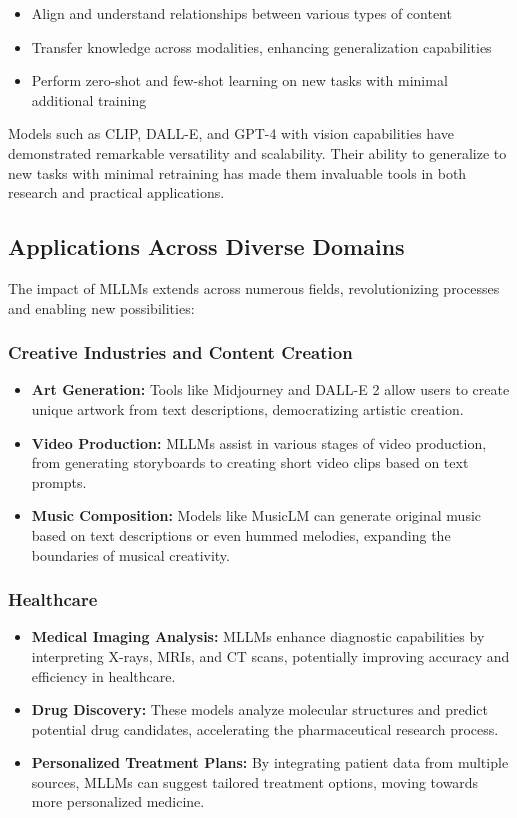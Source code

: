 \begin{itemize}
    \item Align and understand relationships between various types of content
    \item Transfer knowledge across modalities, enhancing generalization capabilities
    \item Perform zero-shot and few-shot learning on new tasks with minimal additional training
\end{itemize}

Models such as CLIP, DALL-E, and GPT-4 with vision capabilities have demonstrated remarkable versatility and scalability. Their ability to generalize to new tasks with minimal retraining has made them invaluable tools in both research and practical applications.

\subsection{Applications Across Diverse Domains}

The impact of MLLMs extends across numerous fields, revolutionizing processes and enabling new possibilities:

\subsubsection{Creative Industries and Content Creation}
\begin{itemize}
    \item \textbf{Art Generation:} Tools like Midjourney and DALL-E 2 allow users to create unique artwork from text descriptions, democratizing artistic creation.
    \item \textbf{Video Production:} MLLMs assist in various stages of video production, from generating storyboards to creating short video clips based on text prompts.
    \item \textbf{Music Composition:} Models like MusicLM can generate original music based on text descriptions or even hummed melodies, expanding the boundaries of musical creativity.
\end{itemize}

\subsubsection{Healthcare}
\begin{itemize}
    \item \textbf{Medical Imaging Analysis:} MLLMs enhance diagnostic capabilities by interpreting X-rays, MRIs, and CT scans, potentially improving accuracy and efficiency in healthcare.
    \item \textbf{Drug Discovery:} These models analyze molecular structures and predict potential drug candidates, accelerating the pharmaceutical research process.
    \item \textbf{Personalized Treatment Plans:} By integrating patient data from multiple sources, MLLMs can suggest tailored treatment options, moving towards more personalized medicine.
\end{itemize}


